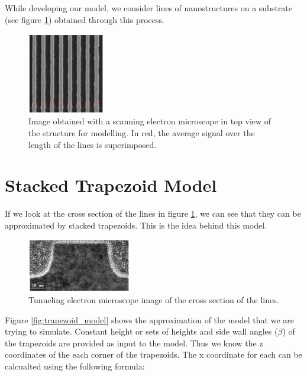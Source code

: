 While developing our model, we consider lines of nanostructures on a substrate (see figure \ref{fig:lines}) obtained through this process.

\begin{figure}[h]
    \centering
    \includegraphics[width=0.3\textwidth]{images/lines_modeled.png}
    \caption{Image obtained with a scanning electron microscope in 
      top view of the structure for modelling. In red, the average signal over the length of the lines is superimposed.\cite{these_reche}}
    \label{fig:lines}
\end{figure}

\section{Stacked Trapezoid Model}

If we look at the cross section of the lines in figure \ref{fig:lines}, we can see that they can be
approximated by stacked trapezoids. This is the idea behind this model.

\begin{figure}[h]
    \centering
    \includegraphics[width=0.4\textwidth]{images/trap_model.PNG}
    \caption{Tunneling electron microscope image of the cross section of the lines.\cite{phd_freychet}}
    \label{fig:trapezoid}
\end{figure}

Figure \ref{fig:trapezoid_model} shows the approximation of the model that we are trying to simulate. Constant height or 
sets of heights and side wall angles ($\beta$) of the trapezoids are provided as input to the model. Thus we know the z coordinates
of the each corner of the trapezoids. The x coordinate for each can be calcualted using the following formula:

